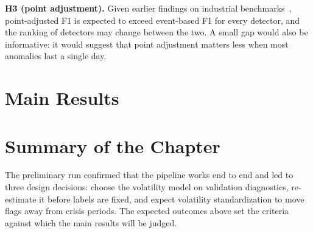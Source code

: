 \textbf{H3 (point adjustment).} Given earlier findings on industrial
benchmarks~\cite{kim2022towards}, point-adjusted F1 is expected to exceed event-based F1 for
every detector, and the ranking of detectors may change between the two. A small gap would
also be informative: it would suggest that point adjustment matters less when most anomalies
last a single day.

\section{Main Results}

\section{Summary of the Chapter}
The preliminary run confirmed that the pipeline works end to end and led to three design
decisions: choose the volatility model on validation diagnostics, re-estimate it before
labels are fixed, and expect volatility standardization to move flags away from crisis
periods. The expected outcomes above set the criteria against which the main results will be
judged.

